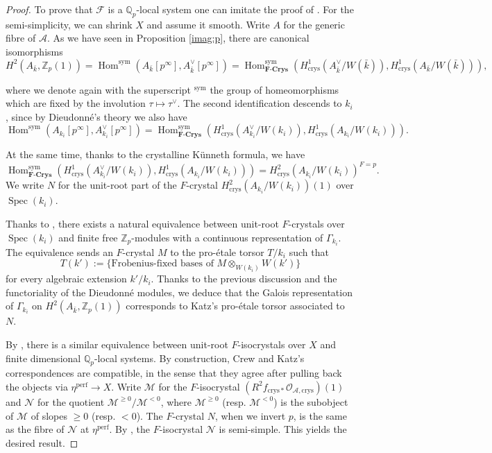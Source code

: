 \documentclass[11pt]{amsart}
\newcommand{\spa}{\medskip}
\newcommand{\kbar}{{\bar{k}}}
\newcommand{\Zp}{{\mathbb{Z}_{p}}}
\newcommand{\Qp}{{\mathbb{Q}_{p}}}
\newcommand{\sym}{{\mathrm{sym}}}
\newcommand{\calA}{\mathcal{A}}
\newcommand{\calF}{\mathcal{F}}
\newcommand{\calO}{\mathcal{O}}
\newcommand{\calM}{\mathcal{M}}
\newcommand{\calN}{\mathcal{N}}
\DeclareMathOperator{\Spec}{Spec}
\DeclareMathOperator{\Hom}{Hom}
\newcommand{\crys}{{\mathrm{crys}}}
\newcommand{\ki}{{k_i}}
\begin{document}
\begin{proof} To prove that $\calF$ is a $\Qp$-local system one can imitate the proof of \cite[Prop. 4.3.13]{CS17}. For the semi-simplicity, we can shrink $X$ and assume it smooth. Write $A$ for the generic fibre of $\calA$. As we have seen in Proposition \ref{imag:p}, there are canonical isomorphisms $$H^2(A_{\kbar},\Zp(1))=\Hom^\sym(A_{\kbar}[p^\infty],A^\vee_{\kbar}[p^\infty])	=\Hom^\sym_{\mathbf{F\textbf{-}Crys}}(H^1_{\crys}(A_{\kbar}^\vee/W(\kbar)),H^1_{\crys}(A_{\kbar}/W(\kbar))),$$
	
	where we denote again with the superscript $^\sym$ the group of homeomorphisms which are fixed by the involution $\tau\mapsto \tau^\vee$. The second identification descends to $\ki$, since by Dieudonné's theory we also have $$\Hom^\sym(A_{\ki}[p^\infty],A^\vee_{\ki}[p^\infty])=\Hom^\sym_{\mathbf{F\textbf{-}Crys}}(H^1_{\crys}(A_{\ki}^\vee/W(\ki)),H^1_{\crys}(A_{\ki}/W(\ki))).$$
	
 At the same time, thanks to the crystalline K\"unneth formula, we have $$\Hom^\sym_{\mathbf{F\textbf{-}Crys}}(H^1_{\crys}(A_{\ki}^\vee/W(\ki)),H^1_{\crys}(A_{\ki}/W(\ki)))=H^2_{\crys}(A_\ki/W(\ki))^{F=p}.$$We write $N$ for the unit-root part of the $F$-crystal $H^2_{\crys}(A_\ki/W(\ki))(1)$ over $\Spec(\ki)$.
	
	\spa
	
	Thanks to \cite[Prop. 4.1.1]{Kat73}, there exists a natural equivalence between unit-root $F$-crystals over $\Spec(\ki)$ and finite free $\Zp$-modules with a continuous representation of $\Gamma_{\ki}$. The equivalence sends an $F$-crystal $M$ to the pro-étale torsor $T/\ki$ such  that $$T(k'):=\{\textrm{Frobenius-fixed bases of $M\otimes_{W(\ki)} W(k')$} \}$$ for every algebraic extension $k'/\ki$. Thanks to the previous discussion and the functoriality of the Dieudonné modules, we deduce that the Galois representation of $\Gamma_{\ki}$ on $H^2(A_{\kbar},\Zp(1))$ corresponds to Katz's pro-étale torsor associated to $N$.
	
	\spa
	
By \cite[Theorem 2.1]{Cre87}, there is a similar equivalence between unit-root $F$-isocrystals over $X$ and finite dimensional $\Qp$-local systems. By construction, Crew and Katz's correspondences are compatible, in the sense that they agree after pulling back the objects via $\eta^\mathrm{perf}\to X$. Write $\calM$ for the $F$-isocrystal $(R^2f_{\crys*}\calO_{\calA,\crys})(1)$ and $\calN$ for the quotient $\calM^{\geq 0}/\calM^{<0}$, where $\calM^{\geq 0}$ (resp. $\calM^{<0}$) is the subobject of $\calM$ of slopes $\geq 0$ (resp. $<0$). The $F$-crystal $N$, when we invert $p$, is the same as the fibre of $\calN$ at $\eta^{\mathrm{perf}}$. By \cite[Thm. 1.1.2]{D'Ad20}, the $F$-isocrystal $\calN$ is semi-simple. This yields the desired result.\end{proof}
\end{document}
